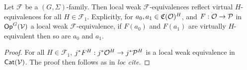 \documentclass[a4paper,10pt
,draft
]{article}%
\renewcommand{\F}{\mathcal F}
\renewcommand{\1}{\eta}%
\begin{document}
\begin{lemma}
      \label{REF_VIRT_LEM}
      Let $\F$ be a $(G, \Sigma)$-family. %
      Then local weak $\F$-equivalences reflect virtual $H$-equivalences for all $H \in \F_1$.
      Explicitly, for
      $a_0,a_1 \in \mathfrak C(\mathcal{O})^H$, and $F: \mathcal{O} \to \mathcal{P}$ in $\mathsf{Op}^G(\mathcal V)$ a local weak $\F$-equivalence,
      if $F(a_0)$ and $F(a_1)$ are virtually $H$-equivalent then so are $a_0$ and $a_1$.
\end{lemma}
\begin{proof}
      For all $H \in \F_1$,
      $j^{\**}F^H: j^{\**}\O^H \to j^{\**}\P^H$ is a local weak equivalence in $\mathsf{Cat}(\mathcal V)$.
      The proof then follows as in \textit{loc cite}.

\end{proof}
\end{document}
